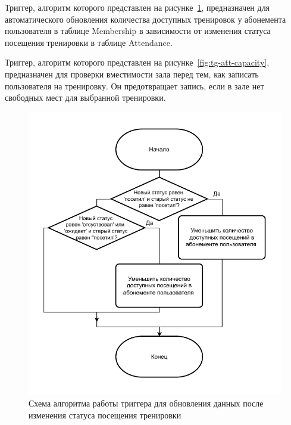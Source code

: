 Триггер, алгоритм которого представлен на рисунке~\ref{fig:tg-upd-mem-ses}, предназначен для автоматического обновления количества доступных тренировок у абонемента пользователя в таблице Membership в зависимости от изменения статуса посещения тренировки в таблице Attendance.

Триггер, алгоритм которого представлен на рисунке~\ref{fig:tg-att-capacity}, предназначен для проверки вместимости зала перед тем, как записать пользователя на тренировку. Он предотвращает запись, если в зале нет свободных мест для выбранной тренировки.

\newpage
\begin{figure}[ht!]
	\centering
	\includegraphics[scale=0.75]{./diag/trg-upd-membership-sessions.pdf}
	\caption{Схема алгоритма работы триггера для обновления данных после изменения статуса посещения тренировки}
	\label{fig:tg-upd-mem-ses}
	
	\vspace{1em} %
	

\end{figure}
